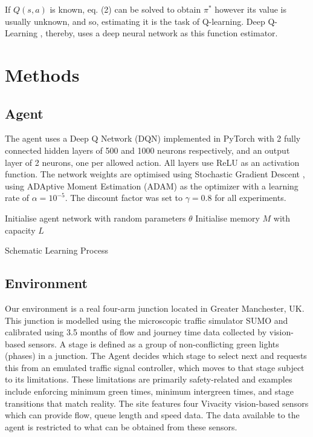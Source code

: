 \documentclass[conference]{IEEEtran}
\begin{document}
If $Q(s,a)$ is known, eq. (2) can be solved to obtain $\pi^*$ however its value is usually unknown, and so, estimating it is the task of Q-learning. Deep Q-Learning \cite{mnih2015}, thereby, uses a deep neural network as this function estimator.

\section{Methods} \label{methods}
\subsection{Agent}
The agent uses a Deep Q Network (DQN) implemented in PyTorch \cite{pytorch} with 2 fully connected hidden layers of 500 and 1000 neurons respectively, and an output layer of 2 neurons, one per allowed action.
All layers use ReLU as an activation function. The network weights are optimised using Stochastic Gradient Descent \cite{kiefer}, using ADAptive Moment Estimation (ADAM) \cite{adam} as the optimizer with a learning rate of $\alpha=10^{-5}$. The discount factor was set to $\gamma=0.8$ for all experiments.

\begin{algorithm}
\SetAlgoLined
 Initialise agent network with random parameters $\theta$\;
 Initialise memory $M$ with capacity $L$\;
 \caption{Schematic Learning Process}
\end{algorithm}
\subsection{Environment}

Our environment is a real four-arm junction located in Greater Manchester, UK.
This junction is modelled using the microscopic traffic simulator SUMO \cite{sumo} and calibrated using 3.5 months of flow and journey time data collected by vision-based sensors.
A stage is defined as a group of non-conflicting green lights (phases) in a junction.
The Agent decides which stage to select next and requests this from an emulated traffic signal controller, which moves to that stage subject to its limitations. These limitations are primarily safety-related and examples include enforcing minimum green times, minimum intergreen times, and stage transitions that match reality.
The site features four Vivacity vision-based sensors which can provide flow, queue length and speed data. The data available to the agent is restricted to what can be obtained from these sensors.
\end{document}
